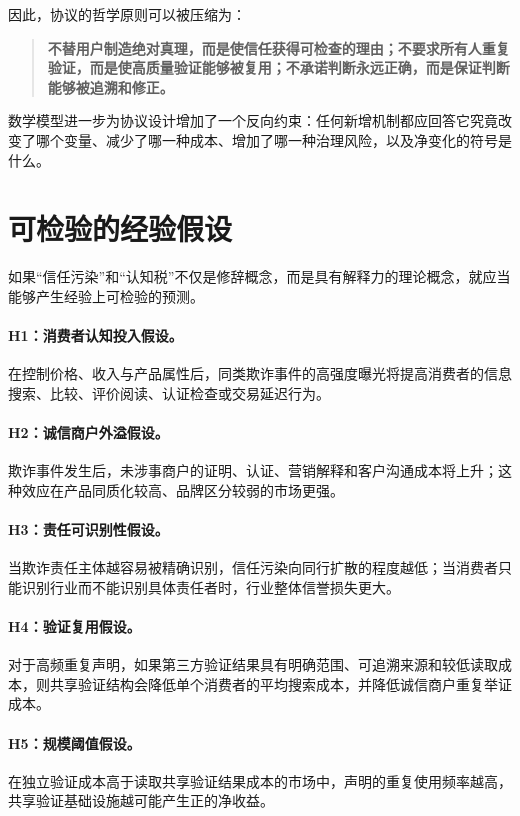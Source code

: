 \documentclass[UTF8,12pt]{ctexart}
\begin{document}
因此，协议的哲学原则可以被压缩为：

\begin{quote}
\textbf{不替用户制造绝对真理，而是使信任获得可检查的理由；不要求所有人重复验证，而是使高质量验证能够被复用；不承诺判断永远正确，而是保证判断能够被追溯和修正。}
\end{quote}

数学模型进一步为协议设计增加了一个反向约束：任何新增机制都应回答它究竟改变了哪个变量、减少了哪一种成本、增加了哪一种治理风险，以及净变化的符号是什么。

\section{可检验的经验假设}

如果“信任污染”和“认知税”不仅是修辞概念，而是具有解释力的理论概念，就应当能够产生经验上可检验的预测。

\paragraph{H1：消费者认知投入假设。}
在控制价格、收入与产品属性后，同类欺诈事件的高强度曝光将提高消费者的信息搜索、比较、评价阅读、认证检查或交易延迟行为。

\paragraph{H2：诚信商户外溢假设。}
欺诈事件发生后，未涉事商户的证明、认证、营销解释和客户沟通成本将上升；这种效应在产品同质化较高、品牌区分较弱的市场更强。

\paragraph{H3：责任可识别性假设。}
当欺诈责任主体越容易被精确识别，信任污染向同行扩散的程度越低；当消费者只能识别行业而不能识别具体责任者时，行业整体信誉损失更大。

\paragraph{H4：验证复用假设。}
对于高频重复声明，如果第三方验证结果具有明确范围、可追溯来源和较低读取成本，则共享验证结构会降低单个消费者的平均搜索成本，并降低诚信商户重复举证成本。

\paragraph{H5：规模阈值假设。}
在独立验证成本高于读取共享验证结果成本的市场中，声明的重复使用频率越高，共享验证基础设施越可能产生正的净收益。
\end{document}
